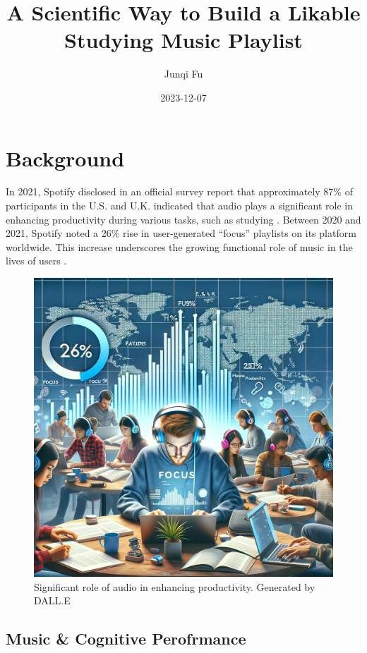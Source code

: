 \documentclass[
]{book}
\title{A Scientific Way to Build a Likable Studying Music Playlist}
\author{Junqi Fu}
\date{2023-12-07}
\begin{document}
\maketitle

{
\setcounter{tocdepth}{1}
\tableofcontents
}
\hypertarget{background}{%
\chapter{Background}\label{background}}

In 2021, Spotify disclosed in an official survey report that approximately 87\% of participants in the U.S. and U.K. indicated that audio plays a significant role in enhancing productivity during various tasks, such as studying \citep{Spotify2021}. Between 2020 and 2021, Spotify noted a 26\% rise in user-generated ``focus'' playlists on its platform worldwide. This increase underscores the growing functional role of music in the lives of users \citep{Spotify2021}.

\begin{figure}
\centering
\includegraphics{1.png}
\caption{Significant role of audio in enhancing productivity. Generated by DALL.E}
\end{figure}

\hypertarget{music-cognitive-perofrmance}{%
\section{Music \& Cognitive Perofrmance}\label{music-cognitive-perofrmance}}
\end{document}
